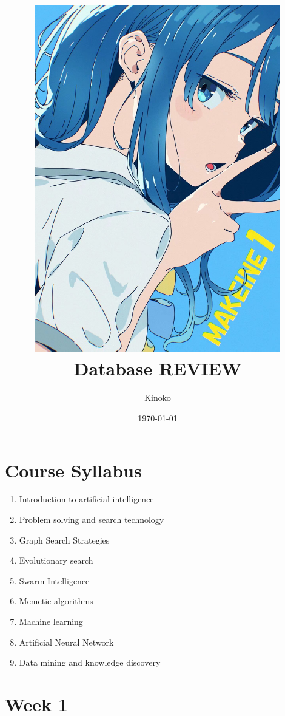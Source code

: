 \documentclass[a4paper, 12pt]{article}
\title{
    \includegraphics[width=0.8\textwidth]{Yanami_ep1.JPG}\\  %
    Database REVIEW
}
\author{Kinoko}
\date{\today}
\begin{document}

\begin{titlepage}  
    \maketitle
\end{titlepage}

\fancyhead[R]{}  %

\tableofcontents
\newpage  %


\section*{Course Syllabus}  %
    \begin{enumerate}
        \item Introduction to artificial intelligence
        \item Problem solving and search technology
        \item Graph Search Strategies
        \item Evolutionary search
        \item Swarm Intelligence
        \item Memetic algorithms 
        \item Machine learning
        \item Artificial Neural Network
        \item Data mining and knowledge discovery
    \end{enumerate}

\newpage

\setcounter{section}{0}

\section{Week 1}
\end{document}
